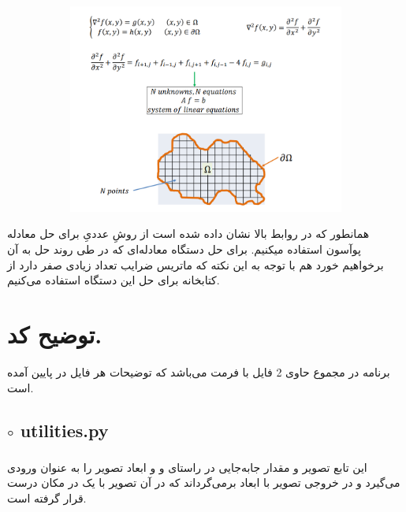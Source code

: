 \documentclass[a4paper,12pt]{article}
\begin{document}
	\begin{figure}[H]
		\centering
		\begin{subfigure}{0.9\textwidth}
			\centering
			\includegraphics[width=\textwidth]{1.png}
		\end{subfigure}
	\end{figure}

همانطور که در روابط بالا نشان داده شده است از روشِ عددیِ
برای حل معادله پوآسون استفاده میکنیم. برای حل دستگاه معادله‌ای که در طی روند حل به آن برخواهیم خورد هم با توجه به این نکته که ماتریس ضرایب تعداد زیادی صفر دارد از کتابخانه 
برای حل این دستگاه استفاده می‌کنیم.

	
	\section*{توضیح کد.}
	برنامه در مجموع حاوی 2 فایل با فرمت
	می‌باشد که توضیحات هر فایل در پایین آمده است.
	\subsection*{$\circ$ utilities.py}
	\subsubsection*{}
	این تابع تصویر 
	و مقدار جابه‌جایی در راستای
	و
	و ابعاد تصویر
	را به عنوان ورودی می‌گیرد و در خروجی تصویر با ابعاد 
	برمی‌گرداند که در آن تصویر
	با یک
	در مکان درست قرار گرفته است.
\end{document}
